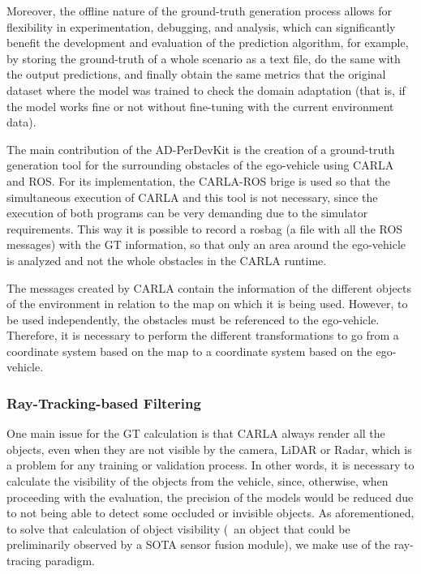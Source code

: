 Moreover, the offline nature of the ground-truth generation process allows for flexibility in experimentation, debugging, and analysis, which can significantly benefit the development and evaluation of the prediction algorithm, for example, by storing the ground-truth of a whole scenario as a text file, do the same with the output predictions, and finally obtain the same metrics that the original dataset where the model was trained to check the domain adaptation (that is, if the model works fine or not without fine-tuning with the current environment data).

The main contribution of the AD-PerDevKit is the creation of a ground-truth generation tool for the surrounding obstacles of the ego-vehicle using CARLA and ROS. For its implementation, the CARLA-ROS brige is used so that the simultaneous execution of CARLA and this tool is not necessary, since the execution of both programs can be very demanding due to the simulator requirements. This way it is possible to record a rosbag (a file with all the ROS messages) with the GT information, so that only an area around the ego-vehicle is analyzed and not the whole obstacles in the CARLA runtime.

The messages created by CARLA contain the information of the different objects of the environment in relation to the map on which it is being used. However, to be used independently, the obstacles must be referenced to the ego-vehicle. Therefore, it is necessary to perform the different transformations to go from a coordinate system based on the map to a coordinate system based on the ego-vehicle.

\subsubsection{Ray-Tracking-based Filtering}
\label{subsubsec:8_ad_perdevkit_object_visibility}

One main issue for the \ac{GT} calculation is that \ac{CARLA} always render all the objects, even when they are not visible by the camera, LiDAR or Radar, which is a problem for any training or validation process. In other words, it is necessary to calculate the visibility of the objects from the vehicle, since, otherwise, when proceeding with the evaluation, the precision of the models would be reduced due to not being able to detect some occluded or invisible objects. As aforementioned, to solve that calculation of object visibility (\ie \ an object that could be preliminarily observed by a \ac{SOTA} sensor fusion module), we make use of the ray-tracing paradigm.


